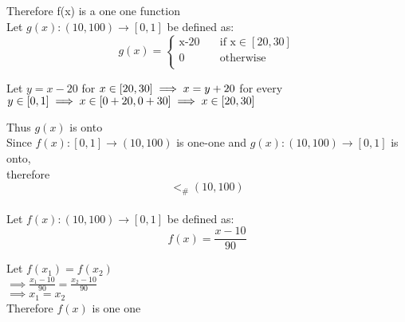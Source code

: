 \documentclass{article}
\begin{document}
Therefore f(x) is a one one function \\

Let \begin{math}
g(x): (10, 100) \to [0, 1]
\end{math}  be defined as:
\begin{equation}
g(x) = 
     \begin{cases}
       \text{x-20} &\quad\text{if x} \in [20, 30]\\
       \text{0} &\quad\text{otherwise} \\
     \end{cases}
\end{equation}

Let 
\begin{math}
y=x-20\end{math} for \begin{math}x \in[20, 30] \\
\implies x=y+20 \end{math}
for every \begin{math}
y \in [0, 1] \\
\implies x \in [0+20, 0+30]  \\
\implies x \in [20, 30]
\end{math}

Thus \begin{math}
g(x)
\end{math} is onto \\

Since \begin{math}
f(x): [0,1] \to (10, 100)
\end{math} is one-one and \begin{math}
g(x): (10, 100) \to [0, 1]
\end{math} is onto, \\therefore \begin{equation}
    [0, 1] <_{\#} (10, 100)
\end{equation} \\

Let \begin{math}
f(x): (10, 100) \to [0, 1]
\end{math}  be defined as:
\begin{equation}
f(x) =  \frac{x-10}{90}
\end{equation}

Let \begin{math} f(x_{1})=f(x_{2}) \end{math} \\
\begin{math}\implies \frac{x_{1}-10}{90}=\frac{x_{2}-10}{90} \end{math} \\
\begin{math}\implies x_{1}=x_{2}\end{math} \\
Therefore \begin{math}
f(x)
\end{math} is one one \\
\end{document}

